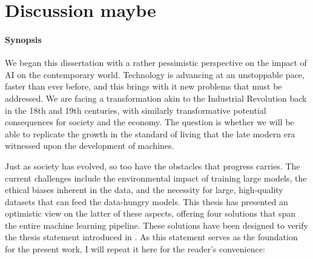 
\graphicspath{{ch7_discussion/}{Figures/}}

\chapter{Discussion maybe}
\label{chapter:discussion}




\subsubsection{Synopsis} \lipsum[1]

\sectionlinenew

We began this dissertation with a rather pessimistic perspective on the impact of AI on the contemporary world. Technology is advancing at an unstoppable pace, faster than ever before, and this brings with it new problems that must be addressed. We are facing a transformation akin to the Industrial Revolution back in the 18th and 19th centuries, with similarly transformative potential consequences for society and the economy. The question is whether we will be able to replicate the growth in the standard of living that the late modern era witnessed upon the development of machines.

Just as society has evolved, so too have the obstacles that progress carries. The current challenges include the environmental impact of training large models, the ethical biases inherent in the data, and the necessity for large, high-quality datasets that can feed the data-hungry models. This thesis has presented an optimistic view on the latter of these aspects, offering four solutions that span the entire machine learning pipeline. These solutions have been designed to verify the thesis statement introduced in . As this statement serves as the foundation for the present work, I will repeat it here for the reader's convenience:

